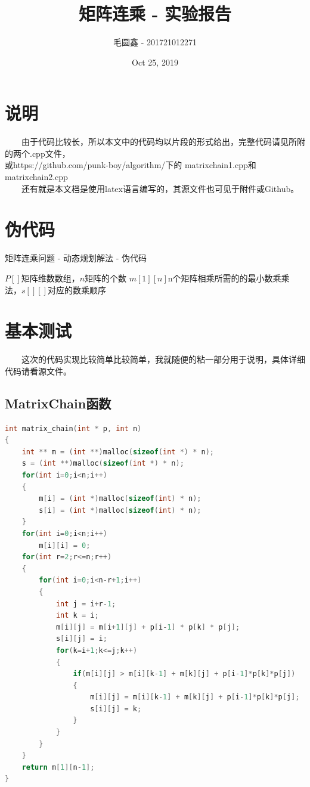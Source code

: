 \documentclass[11pt]{ctexart}
\title{\huge\bf
矩阵连乘 - 实验报告}
\author{毛圆鑫 - 201721012271}
\date{Oct 25, 2019}
\begin{document}
  
\maketitle
\section*{说明}
\noindent　　由于代码比较长，所以本文中的代码均以片段的形式给出，完整代码请见所附的两个.cpp文件，\\或https://github.com/punk-boy/algorithm/下的 matrixchain1.cpp和 matrixchain2.cpp\\
\noindent　　还有就是本文档是使用latex语言编写的，其源文件也可见于附件或Github。


\section{伪代码}
\begin{algorithm}[H]
\caption{矩阵连乘问题 - 动态规划解法 - 伪代码}
\begin{algorithmic}[1]
\Require $P[]$矩阵维数数组，$n$矩阵的个数
\Ensure $m[1][n]$n个矩阵相乘所需的的最小数乘乘法，$s[][]$对应的数乘顺序
\EndFor
{}
\EndFor
\EndFor
\EndFor
{}
\EndFunction
\end{algorithmic}
\end{algorithm}


\section{基本测试}
\noindent　　这次的代码实现比较简单比较简单，我就随便的粘一部分用于说明，具体详细代码请看源文件。
\subsection{MatrixChain函数}
\begin{lstlisting}[language=C++]
int matrix_chain(int * p, int n)
{
	int ** m = (int **)malloc(sizeof(int *) * n);
	s = (int **)malloc(sizeof(int *) * n);
	for(int i=0;i<n;i++)
	{
		m[i] = (int *)malloc(sizeof(int) * n);
		s[i] = (int *)malloc(sizeof(int) * n);
	}
	for(int i=0;i<n;i++)
		m[i][i] = 0;		
	for(int r=2;r<=n;r++)
	{
		for(int i=0;i<n-r+1;i++)
		{
			int j = i+r-1;
			int k = i;
			m[i][j] = m[i+1][j] + p[i-1] * p[k] * p[j];
			s[i][j] = i;
			for(k=i+1;k<=j;k++)
			{
				if(m[i][j] > m[i][k-1] + m[k][j] + p[i-1]*p[k]*p[j])
				{
					m[i][j] = m[i][k-1] + m[k][j] + p[i-1]*p[k]*p[j];
					s[i][j] = k;
				}
			}
		}
	}
	return m[1][n-1];
}
\end{lstlisting}
\end{document}
